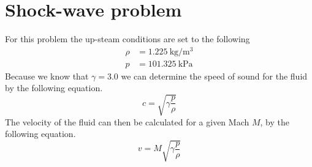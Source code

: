 \documentclass[paper=a4, fontsize=12pt]{scrartcl}
\begin{document}
\section{Shock-wave problem}
For this problem the up-steam conditions are set to the following
\begin{align*}
        \rho &= \SI{1.225}{\kilogram \per \meter^3}\\
        p &= \SI{101.325}{\kilo \pascal}
\end{align*}
Because we know that $\gamma = 3.0$ we can determine the speed of sound for the fluid by the following
equation.
\[
        c= \sqrt{\gamma \frac{p}{\rho}}
\]
The velocity of the fluid can then be calculated for a given Mach $M$, by the following equation.
\[
v = M \sqrt{\gamma \frac{p}{\rho}}
\]
\end{document}
